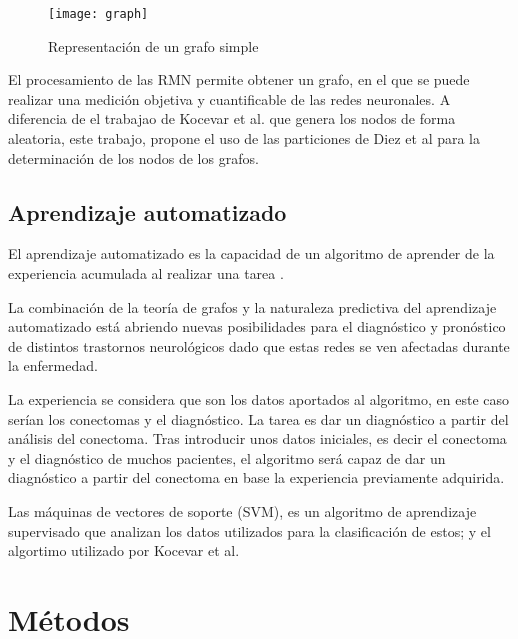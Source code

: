 \documentclass[fleqn,10pt]{UICArticle} %
\begin{document}
\begin{figure}[ht]
	\centering
	\texttt{[image: graph]}
	\caption{Representación de un grafo simple}
	\label{fig:graph}
\end{figure}

El procesamiento de las RMN permite obtener un grafo, en el que se puede realizar una medición objetiva y cuantificable de las redes neuronales. A diferencia de el trabajao de Kocevar et al.\cite{Kocevar2016} que genera los nodos de forma aleatoria, este trabajo, propone el uso de las particiones de Diez et al \cite{Diez2015} para la determinación de los nodos de los grafos.


\subsection{Aprendizaje automatizado}

El aprendizaje automatizado es la capacidad de un algoritmo de aprender de la experiencia acumulada al realizar una tarea \cite{Friedman1997}.

La combinación de la teoría de grafos y la naturaleza predictiva del aprendizaje automatizado está abriendo nuevas posibilidades para el diagnóstico y pronóstico de distintos trastornos neurológicos dado que estas redes se ven afectadas durante la enfermedad. 

La experiencia se considera que son los datos aportados al algoritmo, en este caso serían los conectomas y el diagnóstico. La tarea es dar un diagnóstico a partir del análisis del conectoma. Tras introducir unos datos iniciales, es decir el conectoma y el diagnóstico de muchos pacientes, el algoritmo será capaz de dar un diagnóstico a partir del conectoma en base la experiencia previamente adquirida.

Las máquinas de vectores de soporte (SVM), es un algoritmo de aprendizaje supervisado que analizan los datos utilizados para la clasificación de estos; y el algortimo utilizado por Kocevar et al.\cite{Kocevar2016}


 

\section{Métodos}
\end{document}
